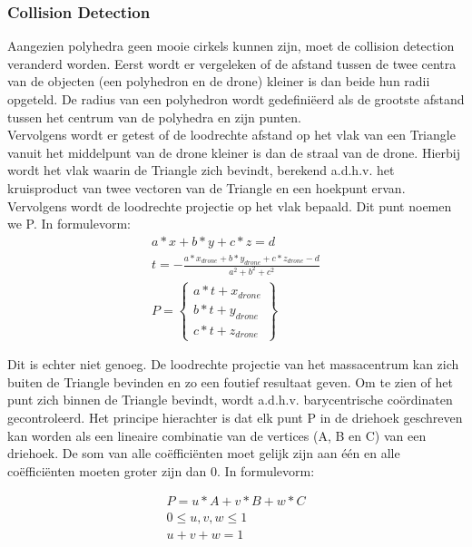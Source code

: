\subsubsection{Collision Detection}
Aangezien polyhedra geen mooie cirkels kunnen zijn, moet de collision detection veranderd worden. Eerst wordt er vergeleken of de afstand tussen de twee centra van de objecten (een polyhedron en de drone) kleiner is dan beide hun radii opgeteld. De radius van een polyhedron wordt gedefiniëerd als de grootste afstand tussen het centrum van de polyhedra en zijn punten. \\
\noindent
Vervolgens wordt er getest of de loodrechte afstand op het vlak van een Triangle vanuit het middelpunt van de drone kleiner is dan de straal van de drone. Hierbij wordt het vlak waarin de Triangle zich bevindt, berekend a.d.h.v. het kruisproduct van twee vectoren van de Triangle en een hoekpunt ervan. Vervolgens wordt de loodrechte projectie op het vlak bepaald. Dit punt noemen we P. In formulevorm: 
\begin{gather*}
	a*x + b*y + c*z = d \\ 
	t = -\frac{a * x_{drone} + b * y_{drone} + c * z_{drone} - d}{a^2 + b^2 + c^2}  \\ P =
	\begin{Bmatrix}
	a*t + x_{drone}\\ 
	b*t + y_{drone}\\ 
	c*t + z_{drone}
	\end{Bmatrix}
\end{gather*}

\noindent
 Dit is echter niet genoeg. De loodrechte projectie van het massacentrum  kan zich buiten de Triangle bevinden en zo een foutief resultaat geven. Om te zien of het punt zich binnen de Triangle bevindt, wordt a.d.h.v. barycentrische coördinaten gecontroleerd. Het principe hierachter is dat elk punt P in de driehoek geschreven kan worden als een lineaire combinatie van de vertices (A, B en C) van een driehoek. De som van alle coëfficiënten moet gelijk zijn aan één en alle coëfficiënten moeten groter zijn dan 0. In formulevorm:
 
 \begin{gather*}
 	P = u*A + v*B + w*C \\
 	0 \le u,v,w \le 1 \\
 	u + v + w = 1
 \end{gather*}



